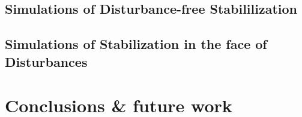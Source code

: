 \documentclass[a4paper,11pt,twoside]{book}
\begin{document}
    
    
    
    

  \chapter{Simulations of Disturbance-free Stabililization}
    \label{chapter:simulations_without_disturbances}

    
    

  \chapter{Simulations of Stabilization in the face of Disturbances}
    \label{chapter:simulations_with_disturbances}

    
    


\part{Conclusions \& future work}
    \label{chapter:conclusions_future_work}

    
    
\end{document}
